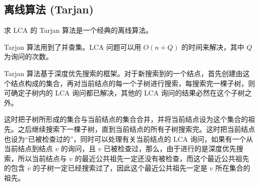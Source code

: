 \subsection{离线算法 (Tarjan)}
	求 LCA 的 Tarjan 算法是一个经典的离线算法。
	
	Tarjan 算法用到了并查集。LCA 问题可以用 $O(n+Q)$ 的时间来解决，其中 $Q$ 为询问的次数。
	
	Tarjan 算法基于深度优先搜索的框架。对于新搜索到的一个结点，首先创建由这个结点构成的集合，再对当前结点的每一个子树进行搜索，每搜索完一棵子树，则可确定子树内的 LCA 询问都已解决，其他的 LCA 询问的结果必然在这个子树之外。
	
	这时把子树所形成的集合与当前结点的集合合并，并将当前结点设为这个集合的祖先。之后继续搜索下一棵子树，直到当前结点的所有子树搜索完。这时把当前结点也设为“已被检查过的”，同时可以处理有关当前结点的 LCA 询问，如果有一个从当前结点到结点 $v$ 的询问，且 $v$ 已被检查过，那么，由于进行的是深度优先搜索，所以当前结点与 $v$ 的最近公共祖先一定还没有被检查，而这个最近公共祖先的包含 $v$ 的子树一定已经搜索过了，因此这个最近公共祖先一定是 $v$ 所在集合的祖先。
	
	